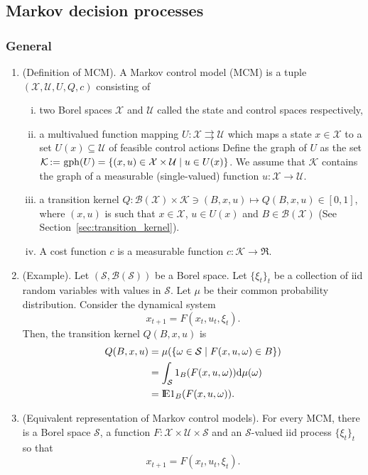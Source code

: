 \documentclass[a4paper,10pt]{article}
\begin{document}
\subsection{Markov decision processes}

\subsubsection{General}
\begin{enumerate}
 \item (Definition of MCM). 
       A Markov control model (MCM) is a tuple
       \(\left(\mathcal{X},\mathcal{U}, U, Q, c\right)\) consisting of 
       \begin{enumerate}[i.]
        \item two Borel spaces $\mathcal{X}$ and $\mathcal{U}$ called the state and control spaces respectively,
        
        \item a multivalued function mapping $U:\mathcal{X} \rightrightarrows \mathcal{U}$ which maps
              a state $x\in\mathcal{X}$ to a set $U(x)\subseteq \mathcal{U}$ of feasible control actions
              Define the graph of $U$ as the set
	      $\mathcal{K} {}\mathop{\mathrel{:}=}{} \operatorname{gph}(U)=\{(x,u)\in \mathcal{X}\times \mathcal{U} \mid u\in U(x)\}$.
	      We assume that $\mathcal{K}$ contains the graph of a measurable (single-valued) function $u:\mathcal{X}\to\mathcal{U}$.
	      
        \item a transition kernel 
              $Q:\mathcal{B}(\mathcal{X})\times \mathcal{K}\ni(B,x,u)\mapsto Q(B, x, u)\in [0,1]$, where $(x,u)$ 
              is such that $x\in\mathcal{X}$, $u\in U(x)$ and $B\in\mathcal{B}(\mathcal{X})$ (See Section~\ref{sec:transition_kernel}).              
              
	\item A cost function $c$ is a measurable function $c:\mathcal{K}\to \Re$.
       \end{enumerate}
 \item (Example). Let $(\mathcal{S}, \mathcal{B}(\mathcal{S}))$ be a Borel space. 
	Let $\{\xi_t\}_t$ be a collection of iid random variables with values in $\mathcal{S}$.
	Let $\mu$ be their common probability distribution. Consider the dynamical system
	\[
	  x_{t+1} = F(x_t, u_t, \xi_t).
	\]
	Then, the transition kernel $Q(B,x,u)$ is
	\begin{align*}
	  Q(B,x,u) &= \mu(\{\omega \in \mathcal{S} \mid F(x,u,\omega)\in B\})\\
	  &= \int_{\mathcal{S}}1_{B}(F(x,u,\omega))\d\mu(\omega)\\
	  &= \E 1_{B}(F(x,u,\omega)).
	\end{align*}
 \item (Equivalent representation of Markov control models).
	For every MCM, there is a Borel space $\mathcal{S}$, a function 
	$F:\mathcal{X}\times\mathcal{U}\times\mathcal{S}$ and an $\mathcal{S}$-valued 
	iid process $\{\xi_t\}_t$ so that
	\[
	 x_{t+1} = F(x_t, u_t, \xi_t).
	\]


\end{enumerate}
\end{document}

